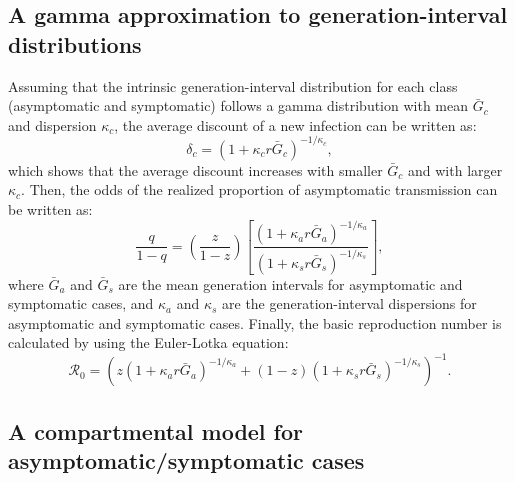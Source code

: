 \documentclass[12pt]{article}
\begin{document}
\subsection*{A gamma approximation to generation-interval distributions}

Assuming that the intrinsic generation-interval distribution for each class (asymptomatic and symptomatic) follows a gamma distribution with mean $\bar G_c$ and dispersion $\kappa_c$, the average discount of a new infection can be written as:
\begin{equation}
\delta_c = (1 + \kappa_c r \bar G_c)^{-1/\kappa_c},
\end{equation}
which shows that the average discount increases with smaller $\bar G_c$ and with larger $\kappa_c$.
Then, the odds of the realized proportion of asymptomatic transmission can be written as:
\begin{equation}
\frac{q}{1-q}=\left(\frac{z}{1-z}\right)\left[\frac{(1 + \kappa_a r \bar G_a)^{-1/\kappa_a}}{(1 + \kappa_s r \bar G_s)^{-1/\kappa_s}}\right],
\end{equation}
where $\bar G_a$ and $\bar G_s$ are the mean generation intervals for asymptomatic and symptomatic cases, and $\kappa_a$ and $\kappa_s$ are the generation-interval dispersions for asymptomatic and symptomatic cases.
Finally, the basic reproduction number is calculated by using the Euler-Lotka equation:
\begin{equation}
\mathcal R_0 = \left(z (1 + \kappa_a r \bar G_a)^{-1/\kappa_a} + (1-z) (1 + \kappa_s r \bar G_s)^{-1/\kappa_s}\right)^{-1}.
\end{equation}

\subsection*{A compartmental model for asymptomatic/symptomatic cases}
\end{document}
